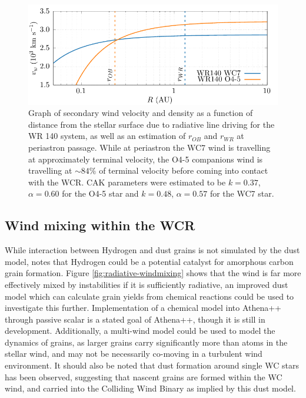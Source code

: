 \begin{figure}
  \centering
  \includegraphics{assets/stagnation-point/stag.pdf}
  \caption[Stagnation point wind velocity]{Graph of secondary wind velocity and density as a function of distance from the stellar surface due to radiative line driving for the WR 140 system, as well as an estimation of $r_{OB}$ and $r_{WR}$ at periastron passage. While at periastron the WC7 wind is travelling at approximately terminal velocity, the O4-5 companions wind is travelling at $\sim 84\%$ of terminal velocity before coming into contact with the WCR. CAK parameters were estimated to be $k = 0.37$, $\alpha = 0.60$ for the O4-5 star and $k=0.48$, $\alpha = 0.57$ for the WC7 star.}
  \label{fig:wr140-stagnation-obwind}
\end{figure}

\subsection{Wind mixing within the WCR}


While interaction between Hydrogen and dust grains is not simulated by the dust model, \textcite{leteuffModelDustFormation2002} notes that Hydrogen could be a potential catalyst for amorphous carbon grain formation.
Figure \ref{fig:radiative-windmixing} shows that the wind is far more effectively mixed by instabilities if it is sufficiently radiative, an improved dust model which can calculate grain yields from chemical reactions could be used to investigate this further.
Implementation of a chemical model into Athena++ through passive scalar is a stated goal of Athena++, though it is still in development.
Additionally, a multi-wind model could be used to model the dynamics of grains, as larger grains carry significantly more than atoms in the stellar wind, and may not be necessarily co-moving in a turbulent wind environment.
It should also be noted that dust formation around single WC stars has been observed, suggesting that nascent grains are formed within the WC wind, and carried into the Colliding Wind Binary as implied by this dust model.

